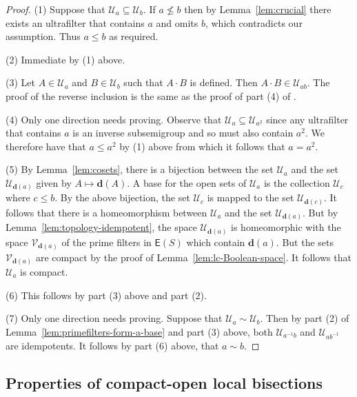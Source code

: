 \documentclass[a4paper]{amsart}
\begin{document}
\begin{proof} 
(1) Suppose that  $\mathscr{U}_{a} \subseteq \mathscr{U}_{b}$.
If $a \nleq b$ then by Lemma~\ref{lem:crucial} there exists an ultrafilter that contains $a$ and omits $b$,
which contradicts our assumption.
Thus $a \leq b$ as required.

(2) Immediate by (1) above.

(3) Let $A \in \mathscr{U}_{a}$ and $B \in \mathscr{U}_{b}$ such that $A \cdot B$ is defined.
Then $A \cdot B \in \mathscr{U}_{ab}$. The proof of the reverse inclusion is the same as the proof of part (4) of \cite{Lawson3}.

(4) Only one direction needs proving.
Observe that $\mathscr{U}_{a} \subseteq \mathscr{U}_{a^{2}}$ since
any ultrafilter that contains $a$ is an inverse subsemigroup and so must also contain $a^{2}$.
We therefore have that $a \leq a^{2}$ by (1) above from which it follows that $a = a^{2}$.

(5) By Lemma~\ref{lem:cosets}, there is a bijection between the set $\mathscr{U}_{a}$ and the set $\mathscr{U}_{\mathbf{d}(a)}$
given by $A \mapsto \mathbf{d}(A)$.
A base for the open sets of $\mathscr{U}_{a}$ is the collection $\mathscr{U}_{c}$ where $c \leq b$.
By the above bijection, the set $\mathscr{U}_{c}$ is mapped to the set $\mathscr{U}_{\mathbf{d}(c)}$.
It follows that there is a homeomorphism between $\mathscr{U}_{a}$ and the set $\mathscr{U}_{\mathbf{d}(a)}$.
But by Lemma~\ref{lem:topology-idempotent}, the space $\mathscr{U}_{\mathbf{d}(a)}$ is homeomorphic with the space
$\mathscr{V}_{\mathbf{d}(a)}$ of the prime filters in $\mathsf{E}(S)$ which contain $\mathbf{d}(a)$.
But the sets $\mathscr{V}_{\mathbf{d}(a)}$ are compact by the proof of Lemma~\ref{lem:lc-Boolean-space}.
It follows that $\mathscr{U}_{a}$ is compact.

(6) This follows by part (3) above and part (2).

(7) Only one direction needs proving. Suppose that $\mathscr{U}_{a} \sim \mathscr{U}_{b}$. 
Then by  part (2) of Lemma~\ref{lem:primefilters-form-a-base} and part (3) above,
both $\mathscr{U}_{a^{-1}b}$ and $\mathscr{U}_{ab^{-1}}$ are idempotents.
It follows by part (6) above, that $a \sim b$.
\end{proof}





\subsection{Properties of compact-open local bisections}
\end{document}
